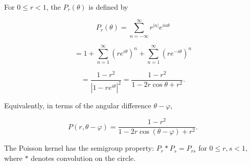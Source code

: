 For $0 \leq r < 1$, the  $P_r(\theta)$ is defined by

$$P_r(\theta) = \sum_{n=-\infty}^{\infty} r^{|n|} e^{in\theta}$$

$$= 1 + \sum_{n=1}^{\infty} (re^{i\theta})^n + \sum_{n=1}^{\infty} (re^{-i\theta})^n$$

$$= \frac{1 - r^2}{|1 - re^{i\theta}|^2} = \frac{1 - r^2}{1 - 2r \cos\theta + r^2}.$$

Equivalently, in terms of the angular difference $\theta - \varphi$,

$$P(r, \theta - \varphi) = \frac{1 - r^2}{1 - 2r \cos(\theta - \varphi) + r^2}.$$

The Poisson kernel has the semigroup property: $P_r * P_s = P_{rs}$ for $0 \leq r, s < 1$, where $*$ denotes convolution on the circle.
